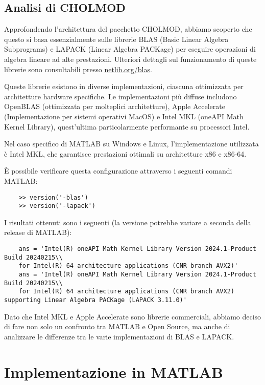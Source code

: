 \subsection{Analisi di CHOLMOD}

Approfondendo l'architettura del pacchetto CHOLMOD, abbiamo scoperto che questo si basa essenzialmente sulle librerie 
BLAS (Basic Linear Algebra Subprograms) e LAPACK (Linear Algebra PACKage) per eseguire operazioni di algebra lineare 
ad alte prestazioni. Ulteriori dettagli sul funzionamento di queste librerie sono consultabili presso 
\href{https://netlib.org/blas/}{netlib.org/blas}.

Queste librerie esistono in diverse implementazioni, ciascuna ottimizzata per architetture hardware specifiche.
Le implementazioni più diffuse includono OpenBLAS (ottimizzata per molteplici architetture), Apple Accelerate 
(Implementazione per sistemi operativi MacOS) e Intel MKL (oneAPI Math Kernel Library), 
quest'ultima particolarmente performante su processori Intel.

Nel caso specifico di MATLAB su Windows e Linux, l'implementazione utilizzata è Intel MKL, 
che garantisce prestazioni ottimali su architetture x86 e x86-64.

È possibile verificare questa configurazione attraverso i seguenti comandi MATLAB:
\begin{verbatim}
    >> version('-blas')
    >> version('-lapack')
\end{verbatim}

I risultati ottenuti sono i seguenti (la versione potrebbe variare a seconda della release di MATLAB):
\begin{verbatim}
    ans = 'Intel(R) oneAPI Math Kernel Library Version 2024.1-Product Build 20240215\\
    for Intel(R) 64 architecture applications (CNR branch AVX2)'
    ans = 'Intel(R) oneAPI Math Kernel Library Version 2024.1-Product Build 20240215\\
    for Intel(R) 64 architecture applications (CNR branch AVX2) supporting Linear Algebra PACKage (LAPACK 3.11.0)'
\end{verbatim}

Dato che Intel MKL e Apple Accelerate sono librerie commerciali, abbiamo deciso di fare non solo un confronto tra MATLAB e Open Source,
ma anche di analizzare le differenze tra le varie implementazioni di BLAS e LAPACK.

\section{Implementazione in MATLAB}

